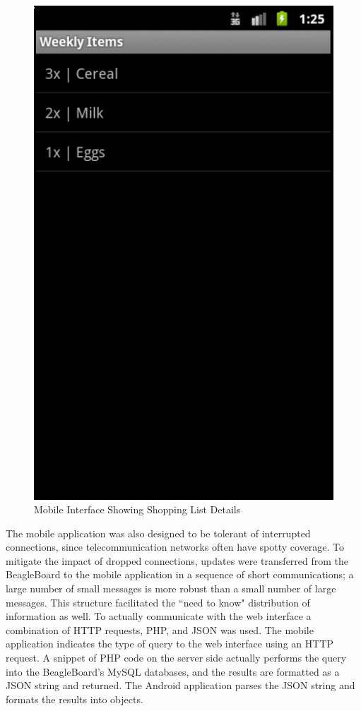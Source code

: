 \documentclass[11pt]{article} %
\begin{document}
\begin{figure}[h!]
\vspace{0.5cm}
\begin{center}
\includegraphics[scale=0.35]{../graphics/mobile_listContents}
\caption{Mobile Interface Showing Shopping List Details}
\label{mob4}
\end{center}
\end{figure}
\pagebreak
\quad \newline \quad \newline
The mobile application was also designed to be tolerant of interrupted connections, since telecommunication networks often have spotty coverage. To mitigate the impact of dropped connections, updates were transferred from the BeagleBoard to the mobile application in a sequence of short communications; a large number of small messages is more robust than a small number of large messages. This structure facilitated the ``need to know" distribution of information as well.
\newline \quad \newline
To actually communicate with the web interface a combination of HTTP requests, PHP, and JSON was used. The mobile application indicates the type of query to the web interface using an HTTP request. A snippet of PHP code on the server side actually performs the query into the BeagleBoard's MySQL databases, and the results are formatted as a JSON string and returned. The Android application parses the JSON string and formats the results into objects.
\end{document}
